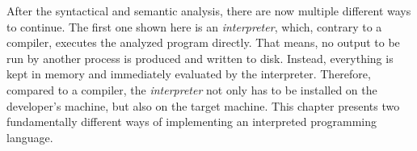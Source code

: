 After the syntactical and semantic analysis, there are now multiple different ways to continue.
The first one shown here is an \emph{interpreter}, which, contrary to a compiler, executes the analyzed program directly.
That means, no output to be run by another process is produced and written to disk.
Instead, everything is kept in memory and immediately evaluated by the interpreter.
Therefore, compared to a compiler, the \emph{interpreter} not only has to be installed on the developer's machine, but also on the target machine.
This chapter presents two fundamentally different ways of implementing an interpreted programming language.
